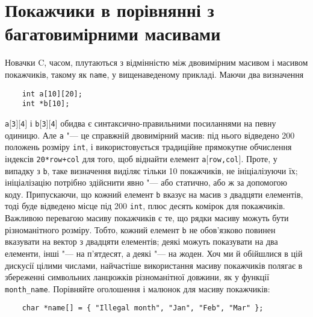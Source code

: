 \documentclass[a4paper,12pt]{book}
\begin{document}
\section{Покажчики в порівнянні з багатовимірними масивами}


  Новачки C, часом, плутаються з відмінністю між двовимірним масивом і масивом покажчиків,
  такому як \texttt{name}, у вищенаведеному прикладі. Маючи два визначення
  \begin{verbatim}
    int a[10][20];
    int *b[10];
  \end{verbatim}
  \texttt{a\mbox{$[$}3\mbox{$]$}\mbox{$[$}4\mbox{$]$}} і
  \texttt{b\mbox{$[$}3\mbox{$]$}\mbox{$[$}4\mbox{$]$}} обидва є синтаксично-правильними
  посиланнями на певну одиницю. Але \texttt{a} "--- це справжній двовимірний масив: під
  нього відведено 200 положень розміру \texttt{int}, і використовується традиційне
  прямокутне обчислення індексів \texttt{20*row+col} для того, щоб віднайти елемент
  \texttt{a\mbox{$[$}row,col\mbox{$]$}}. Проте, у випадку з \texttt{b}, таке визначення
  виділяє тільки 10 покажчиків, не ініціалізуючи їх; ініціалізацію потрібно здійснити явно
  "--- або статично, або ж за допомогою коду. Припускаючи, що кожний елемент \texttt{b}
  вказує на масив з двадцяти елементів, тоді буде відведено місце під 200 \texttt{int},
  плюс десять комірок для покажчиків. Важливою перевагою масиву покажчиків є те, що рядки
  масиву можуть бути різноманітного розміру. Тобто, кожний елемент \texttt{b} не
  обов'язково повинен вказувати на вектор з двадцяти елементів; деякі можуть показувати на
  два елементи, інші "--- на п'ятдесят, а деякі "--- на жоден. Хоч ми й обійшлися в цій
  дискусії цілими числами, найчастіше використання масиву покажчиків полягає в збереженні
  символьних ланцюжків різноманітної довжини, як у функції \texttt{month\_name}.
  Порівняйте оголошення і малюнок для масиву покажчиків:
  \begin{verbatim}
    char *name[] = { "Illegal month", "Jan", "Feb", "Mar" };
  \end{verbatim}
\end{document}
